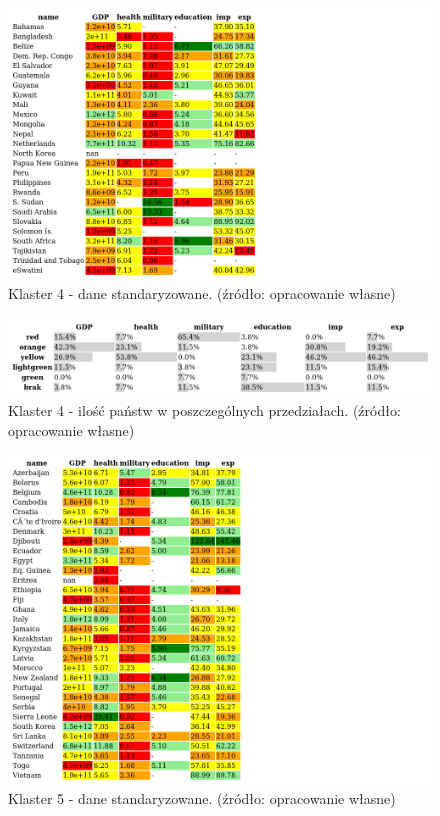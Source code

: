 \documentclass[11pt]{report}
\begin{document}
    \begin{figure}[ht!]
        \centering
        \includegraphics[width=1 \textwidth]{tables/CLUST/cluster4stdkmeans.png}
        \caption{Klaster 4 - dane standaryzowane. (źródło: opracowanie własne)}
        \label{tab:cl4std}
    \end{figure}

    \begin{figure}[ht!]
        \centering
        \includegraphics[width=1 \textwidth]{tables/CLUST/cluster4stdkmeanscount.png}
        \caption{Klaster 4 - ilość państw w poszczególnych przedziałach. (źródło: opracowanie własne)}
        \label{tab:cl4stdcount}
    \end{figure}

    
    \begin{figure}[ht!]
        \centering
        \includegraphics[width=1 \textwidth]{tables/CLUST/cluster5stdkmeans.png}
        \caption{Klaster 5 - dane standaryzowane. (źródło: opracowanie własne)}
        \label{tab:cl5std}
    \end{figure}
\end{document}
